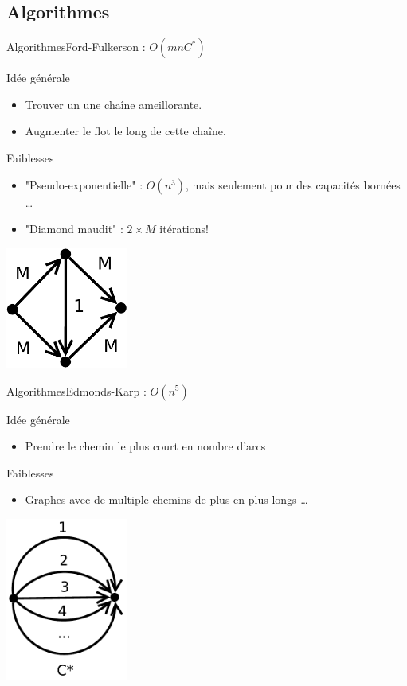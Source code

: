 \subsection{Algorithmes}
\begin{frame}{Algorithmes}{Ford-Fulkerson : $O(mnC^*)$}

\begin{block}{Idée générale}
\begin{itemize}
\item Trouver un une chaîne ameillorante.
\item Augmenter le flot le long de cette chaîne.
\end{itemize}
\end{block}

\begin{block}{Faiblesses}
\begin{itemize}
\item "Pseudo-exponentielle" : $O(n^3)$, mais seulement pour des capacités bornées \ldots
\item "Diamond maudit" : $2\times{M}$ itérations! 
\end{itemize}
\end{block}
\includegraphics[width=0.3\textwidth]{img/maudit}

\end{frame}
\begin{frame}{Algorithmes}{Edmonds-Karp : $O(n^5)$}

\begin{block}{Idée générale}
\begin{itemize}
\item Prendre le chemin le plus court en nombre d'arcs
\end{itemize}
\end{block}

\begin{block}{Faiblesses}
\begin{itemize}
\item Graphes avec de multiple chemins de plus en plus longs \dots
\end{itemize}
\end{block}
\includegraphics[width=0.3\textwidth]{img/anti_ek}

\end{frame}

